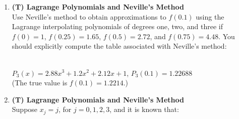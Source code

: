 \documentclass[12pt]{article}
\begin{document}
\begin{enumerate}[label=\bfseries Problem \arabic*:]






 
\item \textbf{(T) Lagrange Polynomials and Neville's Method}\\
Use Neville's method to obtain approximations to $f(0.1)$ using the Lagrange interpolating polynomials of degrees one, two, and three  if\\
 $f(0)=1$, $f(0.25)=1.65$, $f(0.5)=2.72$, and $f(0.75)=4.48$. You should explicitly compute the table associated with Neville's method:
 \begin{table}[h]
\centering
{}
\end{table}\\
$P_3(x)=2.88x^3+1.2x^2+2.12x+1$, $P_3(0.1)=1.22688$\\
(The true value is $f(0.1)=1.2214$.)

\vspace{1em}
\newpage
\item \textbf{(T) Lagrange Polynomials and Neville's Method}\\
Suppose $x_j=j$, for $j=0, 1, 2, 3$, and it is known that:


\end{enumerate}
\end{document}
